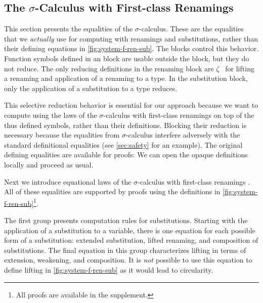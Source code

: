 \documentclass[manuscript,screen,review,anonymous,acmsmall]{acmart}
\begin{document}
\subsection{The $\sigma$-Calculus with First-class Renamings}
\label{sec:laws-renam-subst-1}

This section presents the equalities of the $\sigma$-calculus. These are the equalities that
we \emph{actually} use for computing with renamings and substitutions, rather than their
defining equations 
in \cref{fig:system-f-ren-sub}. The  blocks control this behavior.
Function symbols defined in an
 block are usable outside the block, but they do
not reduce. The only reducing definitions in the renaming
block are $\zeta$~ for lifting a renaming and
application of a renaming to a type. In the substitution block, only
the application of a substitution to a type reduces.

This selective reduction behavior is
essential for our approach because we want to compute using the laws
of the $\sigma$-calculus with first-class renamings  on top of the
thus defined symbols, rather than their definitions. Blocking their
reduction is necessary because the equalities from $\sigma$-calculus 
interfere adversely with the standard definitional equalities (see
\cref{sec:safety} for an example).
The original defining equalities are available for proofs: 
We can open the opaque definitions locally and proceed as usual.


Next we introduce equational laws of the
$\sigma$-calculus with first-class renamings \cite{schafer2015autosubst}.
All of these equalities are supported by proofs using the definitions in
\cref{fig:system-f-ren-sub}\footnote{All proofs are available in the supplement.}.

The first group presents computation rules for substitutions.
\SFTypeSubstitutionBeta
Starting with the application of a substitution to a variable, there is one
equation for each possible form of a substitution: extended
substitution, lifted renaming, and composition of substitutions. The
final equation in this group characterizes lifting in terms of extension,
weakening, and composition. It is \emph{not} possible to use this
equation to define lifting in \cref{fig:system-f-ren-sub} as it would
lead to circularity.
\end{document}
